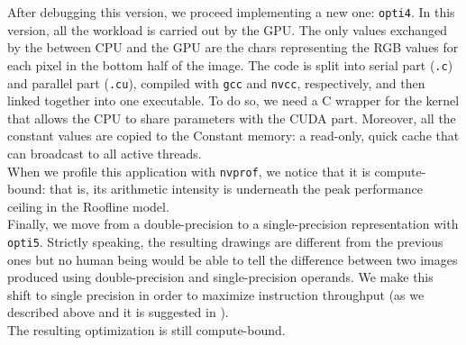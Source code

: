 \documentclass[11pt,a4paper]{article}
\begin{document}
After debugging this version, we proceed implementing a new one: \texttt{opti4}.
In this version, all the workload is carried out by the GPU.
The only values exchanged by the between CPU and the GPU are the chars representing the RGB values for each pixel in the bottom half of the image.
The code is split into serial part (\texttt{.c}) and parallel part (\texttt{.cu}), compiled with \texttt{gcc} and \texttt{nvcc}, respectively, and then linked together into one executable.
To do so, we need a C wrapper for the kernel that allows the CPU to share parameters with the CUDA part.
Moreover, all the constant values are copied to the Constant memory: a read-only, quick cache that can broadcast to all active threads.\\
When we profile this application with \texttt{nvprof}, we notice that it is compute-bound: that is, its arithmetic intensity is underneath the peak performance ceiling in the Roofline model.\\[-7pt]

Finally, we move from a double-precision to a single-precision representation with \texttt{opti5}.
Strictly speaking, the resulting drawings are different from the previous ones but no human being would be able to tell the difference between two images produced using double-precision and single-precision operands.
We make this shift to single precision in order to maximize instruction throughput (as we described above and it is suggested in \cite{guide}).\\
The resulting optimization is still compute-bound.\\[-7pt]
\end{document}
